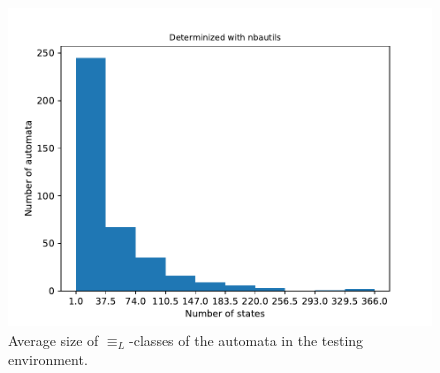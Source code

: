 \begin{figure}
\begin{minipage}{0.49\textwidth}
		\includegraphics[page=2,height=.3\textheight]{../data/analysis/rawstats_detnbaut.pdf}
		\caption{Average size of $\equiv_L$-classes of the automata in the testing environment.}
		\label{exp:fig:rawstats_langclas}
	\end{minipage}
\end{figure}


